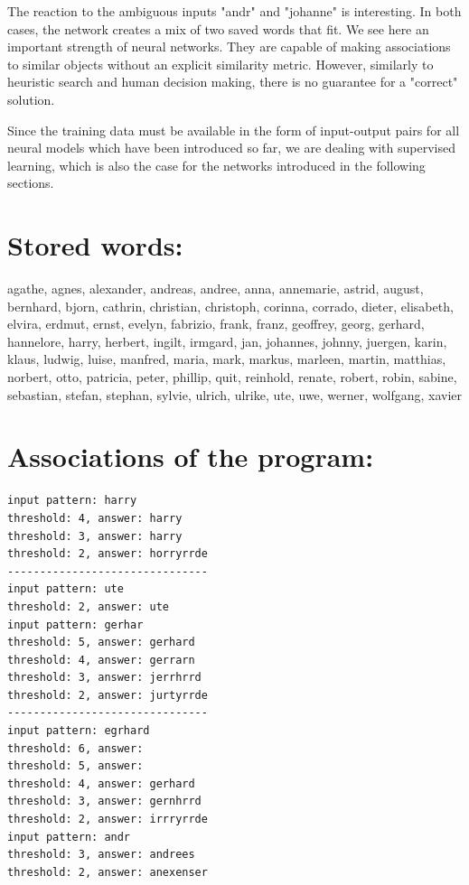 \documentclass[10pt]{article}
\begin{document}
The reaction to the ambiguous inputs "andr" and "johanne" is interesting. In both cases, the network creates a mix of two saved words that fit. We see here an important strength of neural networks. They are capable of making associations to similar objects without an explicit similarity metric. However, similarly to heuristic search and human decision making, there is no guarantee for a "correct" solution.

Since the training data must be available in the form of input-output pairs for all neural models which have been introduced so far, we are dealing with supervised learning, which is also the case for the networks introduced in the following sections.

\section*{Stored words:}
agathe, agnes, alexander, andreas, andree, anna, annemarie, astrid, august, bernhard, bjorn, cathrin, christian, christoph, corinna, corrado, dieter, elisabeth, elvira, erdmut, ernst, evelyn, fabrizio, frank, franz, geoffrey, georg, gerhard, hannelore, harry, herbert, ingilt, irmgard, jan, johannes, johnny, juergen, karin, klaus, ludwig, luise, manfred, maria, mark, markus, marleen, martin, matthias, norbert, otto, patricia, peter, phillip, quit, reinhold, renate, robert, robin, sabine, sebastian, stefan, stephan, sylvie, ulrich, ulrike, ute, uwe, werner, wolfgang, xavier


\section*{Associations of the program:}
\begin{verbatim}
input pattern: harry
threshold: 4, answer: harry
threshold: 3, answer: harry
threshold: 2, answer: horryrrde
-------------------------------
input pattern: ute
threshold: 2, answer: ute
input pattern: gerhar
threshold: 5, answer: gerhard
threshold: 4, answer: gerrarn
threshold: 3, answer: jerrhrrd
threshold: 2, answer: jurtyrrde
-------------------------------
input pattern: egrhard
threshold: 6, answer:
threshold: 5, answer:
threshold: 4, answer: gerhard
threshold: 3, answer: gernhrrd
threshold: 2, answer: irrryrrde
input pattern: andr
threshold: 3, answer: andrees
threshold: 2, answer: anexenser
\end{verbatim}
\end{document}
